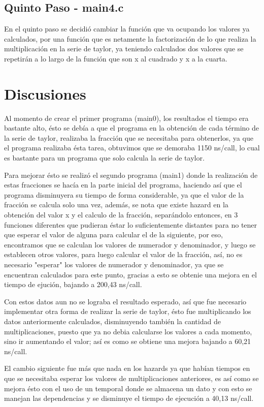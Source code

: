 \documentclass[12pt,letterpaper]{article}
\begin{document}
\subsection{Quinto Paso - main4.c}
En el quinto paso se decidió cambiar la función que va ocupando los valores ya calculados, por una función que es netamente la factorización de lo que realiza la multiplicación en la serie de taylor, ya teniendo calculados dos valores que se repetirán a lo largo de la función que son x al cuadrado y x a la cuarta.
\newpage
\section{Discusiones}
Al momento de crear el primer programa (main0), los resultados el tiempo era bastante alto, ésto se debía a que el programa en la obtención de cada término de la serie de taylor, realizaba la fracción que se necesitaba para obtenerlos, ya que el programa realizaba ésta tarea, obtuvimos que se demoraba 1150 ns/call, lo cual es bastante para un programa que solo calcula la serie de taylor.

Para mejorar ésto se realizó el segundo programa (main1) donde la realización de estas fracciones se hacía en la parte inicial del programa, haciendo así que el programa disminuyera su tiempo de forma considerable, ya que el valor de la fracción se calcula solo una vez, además, se nota que existe hazard en la obtención del valor x y el calculo de la fracción, separándolo entonces, en 3 funciones diferentes que pudieran éstar lo suficientemente distantes para no tener que esperar el valor de alguna para calcular el de la siguiente, por eso, encontramos que se calculan los valores de numerador y denominador, y luego se establecen otros valores, para luego calcular el valor de la fracción, así, no es necesario "esperar" los valores de numerador y denominador, ya que se encuentran calculados para este punto, gracias a esto se obtenie una mejora en el tiempo de ejución, bajando a 200,43 ns/call.

Con estos datos aun no se lograba el resultado esperado, así que fue necesario implementar otra forma de realizar la serie de taylor, ésto fue multiplicando los datos anteriormente calculados, disminuyendo también la cantidad de multiplicaciones, puesto que ya no debia calcularse los valores a cada momento, sino ir aumentando el valor; así es como se obtiene una mejora bajando a 60,21 ns/call.

El cambio siguiente fue más que nada en los hazards ya que habían tiempos en que se necesitaba esperar los valores de multiplicaciones anteriores, es así como se mejora ésto con el uso de un temporal donde se almacena un dato y con esto se manejan las dependencias y se disminuye el tiempo de ejecución a 40,13 ns/call.
\end{document}
